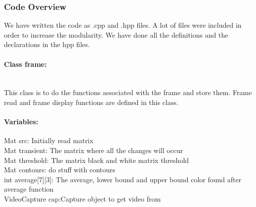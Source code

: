 \documentclass[a4paper,11pt]{article}
\newcommand{\mparagraph}[1]{\paragraph{#1}\mbox{}\\}
\begin{document}
			\subsubsection{Code Overview}

					We have written the code as .cpp and .hpp files. A lot of files were included in order to increase the modularity. We have done all the definitions and the declarations in the hpp files. 

					\mparagraph{Class frame:\\}

						This class is to do the functions associated with the frame and store them. Frame read and frame display functions are defined in this class. 

						\paragraph{Variables:\\}
						 Mat src: Initially read matrix\\
   						 Mat transient: The matrix where all the changes will occur\\
    					 Mat threshold: The matrix black and white matrix threshold\\
   						 Mat contours: do stuff with contours\\
    					 int average[7][3]:  The average, lower bound and upper bound color found after average function\\
   					     VideoCapture cap:Capture object to get video from\\
\end{document}
